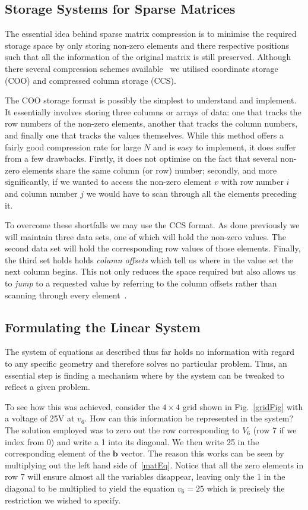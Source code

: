 \documentclass[a4paper]{article}
\renewcommand{\vec}[1]{\bm{#1}}
\begin{document}
\subsection{Storage Systems for Sparse Matrices}
The essential idea behind sparse matrix compression is to minimise the required
storage space by only storing non-zero elements and there respective positions
such that all the information of the original matrix is still preserved.
Although there several compression schemes available~\cite{101matstore} we
utilised coordinate storage (COO) and compressed column storage (CCS).

The COO storage format is possibly the simplest to understand and implement. It
essentially involves storing three columns or arrays of data: one that tracks
the row numbers of the non-zero elements, another that tracks the column
numbers, and finally one that tracks the values themselves. While this method
offers a fairly good compression rate for large $N$ and is easy to implement,
it does suffer from a few drawbacks. Firstly, it does not optimise on the fact
that several non-zero elements share the same column (or row) number; secondly,
and more significantly, if we wanted to access the non-zero element $v$ with
row number $i$ and column number $j$ we would have to scan through all the
elements preceding it.

To overcome these shortfalls we may use the CCS format. As done previously we
will maintain three data sets, one of which will hold the non-zero values. The
second data set will hold the corresponding row values of those elements.
Finally, the third set holds holds \emph{column offsets} which tell us where in
the value set the next column begins. This not only reduces the space required
but also allows us to \emph{jump} to a requested value by referring to the
column offsets rather than scanning through every element~\cite{101matstore}.

\subsection{Formulating the Linear System}
The system of equations as described thus far holds no information with regard
to any specific geometry and therefore solves no particular problem. Thus, an
essential step is finding a mechanism where by the system can be tweaked to
reflect a given problem.

To see how this was achieved, consider the $4 \times 4$ grid shown
in Fig.~\ref{gridFig} with a voltage of 25V at $v_6$. How can this information
be represented in the system? The solution employed was to zero out the row
corresponding to $V_6$ (row 7 if we index from 0) and write a 1 into its
diagonal. We then write 25 in the corresponding element of the $\vec{b}$
vector. The reason this works can be seen by multiplying out the left hand side
of~\eqref{matEq}. Notice that all the zero elements in row 7 will ensure almost
all the variables disappear, leaving only the 1 in the diagonal to be
multiplied to yield the equation $v_6=25$ which is precisely the restriction we
wished to specify.
\end{document}
